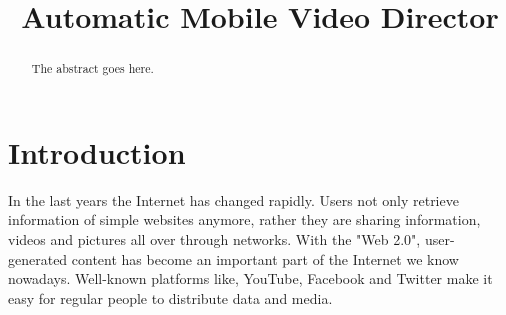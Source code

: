 \documentclass[conference]{IEEEtran}
\begin{document}
\title{Automatic Mobile Video Director}

\author{
\and
\and
\and
}


\maketitle

\begin{abstract}
The abstract goes here.
\end{abstract}

\section{Introduction}
In the last years the Internet has changed rapidly. Users not only retrieve information of simple websites anymore, rather they are sharing information, videos and pictures all over through networks.
With the "Web 2.0", user-generated content has become an important part of the Internet we know nowadays. Well-known platforms like, YouTube, Facebook and Twitter make it easy for regular people to distribute data and media.
\end{document}
